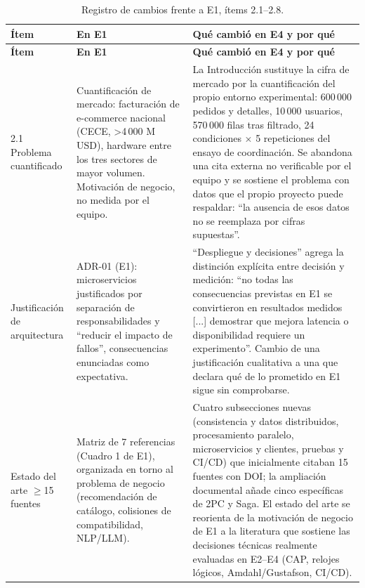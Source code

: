 \documentclass[12pt,a4paper]{article}
\begin{document}
\begin{longtable}{>{\raggedright\arraybackslash}p{2.9cm}>{\raggedright\arraybackslash}p{5.5cm}>{\raggedright\arraybackslash}p{6.2cm}}
\caption{Registro de cambios frente a E1, ítems 2.1--2.8.}\label{tab:cambios-e1}\\
\toprule \textbf{Ítem} & \textbf{En E1} & \textbf{Qué cambió en E4 y por qué}\\\midrule
\endfirsthead
\toprule \textbf{Ítem} & \textbf{En E1} & \textbf{Qué cambió en E4 y por qué}\\\midrule
\endhead
\bottomrule
\endfoot

2.1 Problema cuantificado &
Cuantificación de mercado: facturación de e-commerce nacional (CECE, \textgreater 4\,000 M USD), hardware entre los tres sectores de mayor volumen. Motivación de negocio, no medida por el equipo. &
La Introducción sustituye la cifra de mercado por la cuantificación del propio entorno experimental: 600\,000 pedidos y detalles, 10\,000 usuarios, 570\,000 filas tras filtrado, 24 condiciones $\times$ 5 repeticiones del ensayo de coordinación. Se abandona una cita externa no verificable por el equipo y se sostiene el problema con datos que el propio proyecto puede respaldar: ``la ausencia de esos datos no se reemplaza por cifras supuestas''.\\

2.2 Justificación de arquitectura &
ADR-01 (E1): microservicios justificados por separación de responsabilidades y ``reducir el impacto de fallos'', consecuencias enunciadas como expectativa. &
``Despliegue y decisiones'' agrega la distinción explícita entre decisión y medición: ``no todas las consecuencias previstas en E1 se convirtieron en resultados medidos [...] demostrar que mejora latencia o disponibilidad requiere un experimento''. Cambio de una justificación cualitativa a una que declara qué de lo prometido en E1 sigue sin comprobarse.\\

2.3 Estado del arte $\geq$15 fuentes &
Matriz de 7 referencias (Cuadro 1 de E1), organizada en torno al problema de negocio (recomendación de catálogo, colisiones de compatibilidad, NLP/LLM). &
Cuatro subsecciones nuevas (consistencia y datos distribuidos, procesamiento paralelo, microservicios y clientes, pruebas y CI/CD) que inicialmente citaban 15 fuentes con DOI; la ampliación documental añade cinco específicas de 2PC y Saga. El estado del arte se reorienta de la motivación de negocio de E1 a la literatura que sostiene las decisiones técnicas realmente evaluadas en E2--E4 (CAP, relojes lógicos, Amdahl/Gustafson, CI/CD).\\


\end{longtable}
\end{document}
